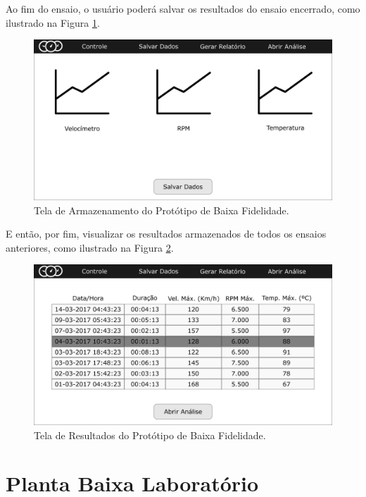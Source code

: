 \begin{anexosenv}
Ao fim do ensaio, o usuário poderá salvar os resultados do ensaio encerrado, como ilustrado na Figura \ref{fig:telasalvardados}.

\begin{figure}[h!]
	\centering
	\includegraphics[keepaspectratio=true,scale= 0.23]{figuras/telasalvardados.png}
	\caption{Tela de Armazenamento do Protótipo de Baixa Fidelidade.}
	\label{fig:telasalvardados}
\end{figure}

E então, por fim, visualizar os resultados armazenados de todos os ensaios anteriores, como ilustrado na Figura \ref{fig:telaresultados}.

\begin{figure}[h!]
	\centering
	\includegraphics[keepaspectratio=true,scale= 0.23]{figuras/telaresultados.png}
	\caption{Tela de Resultados do Protótipo de Baixa Fidelidade.}
	\label{fig:telaresultados}
\end{figure}



\chapter{Planta Baixa Laboratório}
\label{anexoD}


\end{anexosenv}
